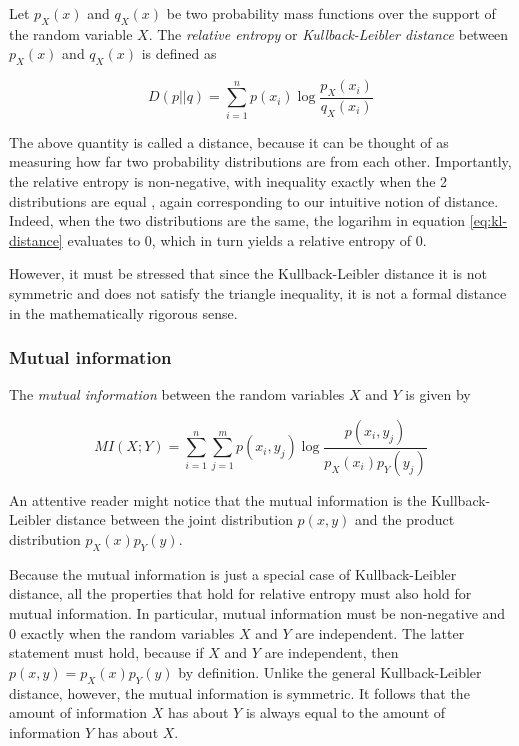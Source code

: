 \documentclass[12pt]{article}
\begin{document}
Let $p_X(x)$ and $q_X(x)$ be two probability mass functions over the support of the random variable $X$. The \textit{relative entropy} or \textit{Kullback-Leibler distance} \cite{cover-thomas} between $p_X(x)$ and $q_X(x)$ is defined as

\begin{equation}
D(p||q) = \sum_{i = 1}^n p(x_i) \log \frac{p_X(x_i)}{q_X(x_i)}
\label{eq:kl-distance}
\end{equation} 

The above quantity is called a distance, because it can be thought of as measuring how far two probability distributions are from each other. Importantly, the relative entropy is non-negative, with inequality exactly when the 2 distributions are equal \cite{cover-thomas}, again corresponding to our intuitive notion of distance. Indeed, when the two distributions are the same, the logarihm in equation \ref{eq:kl-distance} evaluates to 0, which in turn yields a relative entropy of 0. 

However, it must be stressed that since the Kullback-Leibler distance it is not symmetric and does not satisfy the triangle inequality, it is not a formal distance in the mathematically rigorous sense.

\subsubsection{Mutual information}

The \textit{mutual information} \cite{cover-thomas} between the random variables $X$ and $Y$ is given by 

\begin{equation}
MI(X;Y) = \sum_{i=1}^n \sum_{j=1}^m p(x_i,y_j) \log \frac{p(x_i,y_j)}{p_X(x_i)p_Y(y_j)}
\label{eq:mutual-inf}
\end{equation}

An attentive reader might notice that the mutual information is the Kullback-Leibler distance between the joint distribution $p(x,y)$ and the product distribution $p_X(x)p_Y(y)$.

Because the mutual information is just a special case of Kullback-Leibler distance, all the properties that hold for relative entropy must also hold for mutual information. In particular, mutual information must be non-negative and 0 exactly when the random variables $X$ and $Y$ are independent. The latter statement must hold, because if $X$ and $Y$ are independent, then $p(x,y) = p_X(x)p_Y(y)$ by definition. Unlike the general Kullback-Leibler distance, however, the mutual information is symmetric. It follows that the amount of information $X$ has about $Y$ is always equal to the amount of information $Y$ has about $X$. 
\end{document}
